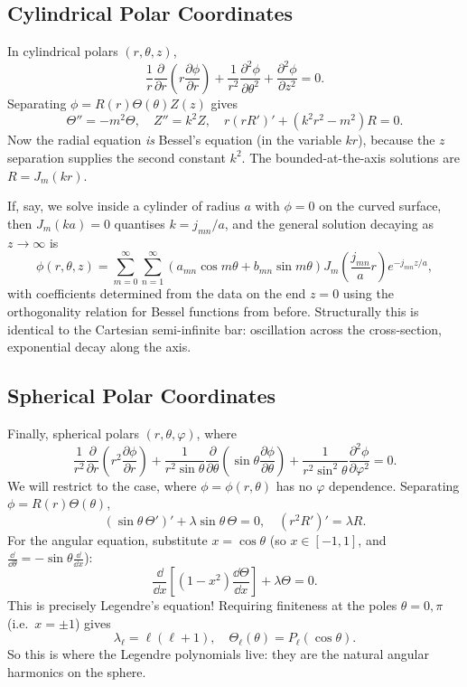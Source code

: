 \documentclass[a4paper]{scrartcl}
\begin{document}
\subsection{Cylindrical Polar Coordinates}

In cylindrical polars $(r, \theta, z)$,
$$
\frac{1}{r}\frac{\partial}{\partial r}\left(r \frac{\partial \phi}{\partial r}\right) + \frac{1}{r^2}\frac{\partial^2 \phi}{\partial \theta^2} + \frac{\partial^2 \phi}{\partial z^2} = 0.
$$
Separating $\phi = R(r)\Theta(\theta) Z(z)$ gives
$$
\Theta'' = -m^2 \Theta, \quad Z'' = k^2 Z, \quad r(rR')' + (k^2 r^2 - m^2) R = 0.
$$
Now the radial equation \emph{is} Bessel's equation (in the variable $kr$), because the $z$ separation supplies the second constant $k^2$. The bounded-at-the-axis solutions are $R = J_m(kr)$.

If, say, we solve inside a cylinder of radius $a$ with $\phi = 0$ on the curved surface, then $J_m(ka) = 0$ quantises $k = j_{mn}/a$, and the general solution decaying as $z \rightarrow \infty$ is
$$
\phi(r, \theta, z) = \sum_{m = 0}^{\infty}\sum_{n = 1}^{\infty} \left(a_{mn} \cos m \theta + b_{mn} \sin m \theta\right) J_m\left(\frac{j_{mn}}{a} r\right) e^{-j_{mn}z/a},
$$
with coefficients determined from the data on the end $z = 0$ using the orthogonality relation for Bessel functions from before. Structurally this is identical to the Cartesian semi-infinite bar: oscillation across the cross-section, exponential decay along the axis.

\subsection{Spherical Polar Coordinates}

Finally, spherical polars $(r, \theta, \varphi)$, where
$$
\frac{1}{r^2}\frac{\partial}{\partial r}\left(r^2 \frac{\partial \phi}{\partial r}\right) + \frac{1}{r^2 \sin \theta} \frac{\partial}{\partial \theta}\left(\sin \theta \frac{\partial \phi}{\partial \theta}\right) + \frac{1}{r^2 \sin^2 \theta} \frac{\partial^2 \phi}{\partial \varphi^2} = 0.
$$
We will restrict to the  case, where $\phi = \phi(r, \theta)$ has no $\varphi$ dependence. Separating $\phi = R(r) \Theta(\theta)$,
$$
(\sin \theta \, \Theta')' + \lambda \sin \theta\, \Theta = 0, \quad (r^2 R')' = \lambda R.
$$
For the angular equation, substitute $x = \cos \theta$ (so $x \in [-1, 1]$, and $\frac{\dd}{\dd \theta} = -\sin\theta \frac{\dd}{\dd x}$):
$$
\frac{\dd}{\dd x}\left[(1 - x^2) \frac{\dd \Theta}{\dd x}\right] + \lambda \Theta = 0.
$$
This is precisely Legendre's equation! Requiring finiteness at the poles $\theta = 0, \pi$ (i.e.\ $x = \pm 1$) gives
$$
\lambda_\ell = \ell (\ell + 1), \quad \Theta_\ell(\theta) = P_\ell(\cos \theta).
$$
So this is where the Legendre polynomials live: they are the natural angular harmonics on the sphere.
\end{document}
